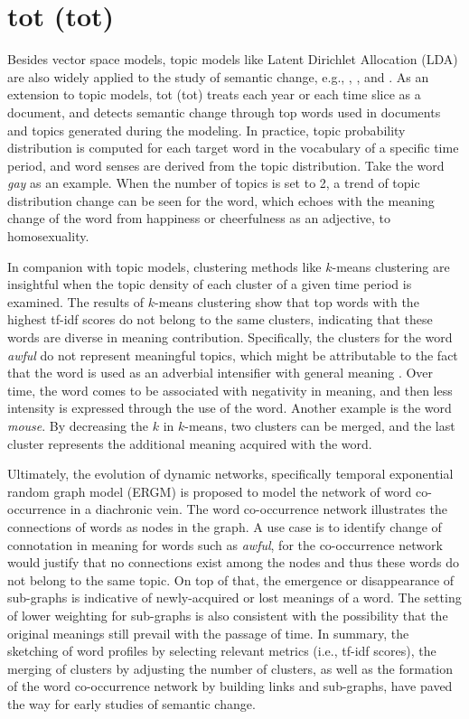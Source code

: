 \section{\acrlong{tot} (\acrshort{tot})}
Besides vector space models, topic models like Latent Dirichlet Allocation (LDA) are also widely applied to the study of semantic change, e.g., \textcite{wang2006topics}, \textcite{wijaya2011understanding}, and \textcite{hengchen2017phd}. As an extension to topic models, \acrlong{tot} (\acrshort{tot}) treats each year or each time slice as a document, and detects semantic change through top words used in documents and topics generated during the modeling. In practice, topic probability distribution is computed for each target word in the vocabulary of a specific time period, and word senses are derived from the topic distribution. Take the word \textit{gay} as an example. When the number of topics is set to 2, a trend of topic distribution change can be seen for the word, which echoes with the meaning change of the word from happiness or cheerfulness as an adjective, to homosexuality.

In companion with topic models, clustering methods like $k$-means clustering are insightful when the topic density of each cluster of a given time period is examined. The results of $k$-means clustering show that top words with the highest tf-idf scores do not belong to the same clusters, indicating that these words are diverse in meaning contribution. Specifically, the clusters for the word \textit{awful} do not represent meaningful topics, which might be attributable to the fact that the word is used as an adverbial intensifier with general meaning \parencite{wijaya2011understanding}. Over time, the word comes to be associated with negativity in meaning, and then less intensity is expressed through the use of the word. Another example is the word \textit{mouse}. By decreasing the $k$ in $k$-means, two clusters can be merged, and the last cluster represents the additional meaning acquired with the word.

Ultimately, the evolution of dynamic networks, specifically temporal exponential random graph model (ERGM) \parencite{robins2007introduction,wijaya2011understanding} is proposed to model the network of word co-occurrence in a diachronic vein. The word co-occurrence network illustrates the connections of words as nodes in the graph. A use case is to identify change of connotation in meaning for words such as \textit{awful}, for the co-occurrence network would justify that no connections exist among the nodes and thus these words do not belong to the same topic. On top of that, the emergence or disappearance of sub-graphs is indicative of newly-acquired or lost meanings of a word. The setting of lower weighting for sub-graphs is also consistent with the possibility that the original meanings still prevail with the passage of time. In summary, the sketching of word profiles by selecting relevant metrics (i.e., tf-idf scores), the merging of clusters by adjusting the number of clusters, as well as the formation of the word co-occurrence network by building links and sub-graphs, have paved the way for early studies of semantic change.

